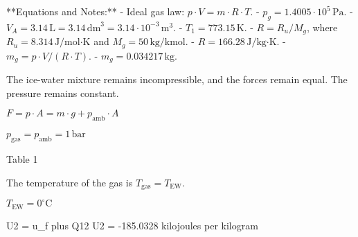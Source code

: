 **Equations and Notes:**
- Ideal gas law: \( p \cdot V = m \cdot R \cdot T \).
- \( p_g = 1.4005 \cdot 10^5 \, \text{Pa} \).
- \( V_A = 3.14 \, \text{L} = 3.14 \, \text{dm}^3 = 3.14 \cdot 10^{-3} \, \text{m}^3 \).
- \( T_1 = 773.15 \, \text{K} \).
- \( R = R_u / M_g \), where \( R_u = 8.314 \, \text{J/mol·K} \) and \( M_g = 50 \, \text{kg/kmol} \).
- \( R = 166.28 \, \text{J/kg·K} \).
- \( m_g = p \cdot V / (R \cdot T) \).
- \( m_g = 0.034217 \, \text{kg} \).

The ice-water mixture remains incompressible, and the forces remain equal. The pressure remains constant.

\( F = p \cdot A = m \cdot g + p_{\text{amb}} \cdot A \)

\( p_{\text{gas}} = p_{\text{amb}} = 1 \, \text{bar} \)

Table 1

The temperature of the gas is \( T_{\text{gas}} = T_{\text{EW}} \).

\( T_{\text{EW}} = 0^\circ \text{C} \)

U2 = u_f plus Q12  
U2 = -185.0328 kilojoules per kilogram